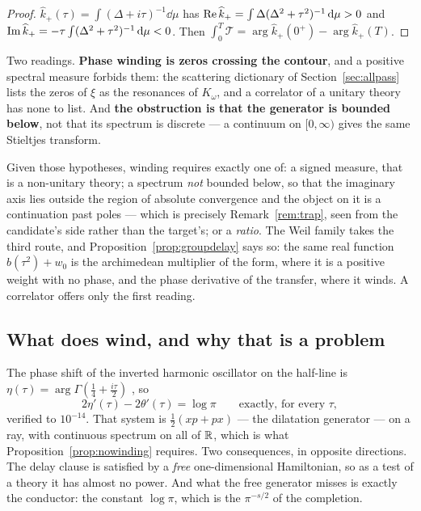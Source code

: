 \begin{proof}
$\widehat k_+(\tau)=\int(\Delta+i\tau)^{-1}\dd\mu$ has
$\operatorname{Re}\widehat k_+=\int\Delta(\Delta^2+\tau^2)^{-1}\,\mathrm d\mu>0$ and
$\operatorname{Im}\widehat k_+=-\tau\int(\Delta^2+\tau^2)^{-1}\,\mathrm d\mu<0$. Then
$\int_0^T\mathcal T=\arg\widehat k_+(0^+)-\arg\widehat k_+(T)$.
\end{proof}

Two readings. \textbf{Phase winding is zeros crossing the contour}, and a positive
spectral measure forbids them: the scattering dictionary of
Section~\ref{sec:allpass} lists the zeros of $\xi$ as the resonances of
$K_\omega$, and a correlator of a unitary theory has none to list. And
\textbf{the obstruction is that the generator is bounded below}, not that its
spectrum is discrete --- a continuum on $[0,\infty)$ gives the same Stieltjes
transform.

\begin{remark}\label{rem:escapes}
Given those hypotheses, winding requires exactly one of: a signed measure, that
is a non-unitary theory; a spectrum \emph{not} bounded below, so that the
imaginary axis lies outside the region of absolute convergence and the object on
it is a continuation past poles --- which is precisely
Remark~\ref{rem:trap}, seen from the candidate's side rather than the target's;
or a \emph{ratio}. The Weil family takes the third route, and
Proposition~\ref{prop:groupdelay} says so: the same real function
$b(\tau^2)+w_0$ is the archimedean multiplier of the form, where it is a positive
weight with no phase, and the phase derivative of the transfer, where it winds. A
correlator offers only the first reading.
\end{remark}

\subsection{What does wind, and why that is a problem}

The phase shift of the inverted harmonic oscillator on the half-line is
$\eta(\tau)=\arg\Gamma(\frac14+\frac{i\tau}2)$ \cite{BhaduriKhareLaw}, so
\begin{equation}\label{eq:freewinding}
 2\eta'(\tau)-2\theta'(\tau)=\log\pi\qquad\text{exactly, for every }\tau,
\end{equation}
verified to $10^{-14}$. That system is $\frac12(xp+px)$ --- the dilatation
generator --- on a ray, with continuous spectrum on all of $\mathbb R$, which is what
Proposition~\ref{prop:nowinding} requires. Two consequences, in opposite
directions. The delay clause is satisfied by a \emph{free} one-dimensional
Hamiltonian, so as a test of a theory it has almost no power. And what the free
generator misses is exactly the conductor: the constant $\log\pi$, which is the
$\pi^{-s/2}$ of the completion.

